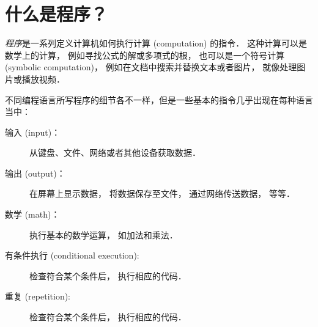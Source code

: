 \section{什么是程序？}



{\em 程序}是一系列定义计算机如何执行计算 (computation) 的指令． 这种计算可以是数学上的计算， 例如寻找公式的解或多项式的根， 也可以是一个符号计算 (symbolic computation)， 例如在文档中搜索并替换文本或者图片， 就像处理图片或播放视频．
  


不同编程语言所写程序的细节各不一样，但是一些基本的指令几乎出现在每种语言当中：


\begin{description}

\item[输入 (input)：] 从键盘、文件、网络或者其他设备获取数据．

\item[输出 (output)：] 在屏幕上显示数据， 将数据保存至文件， 通过网络传送数据， 等等．

\item[数学 (math)：] 执行基本的数学运算， 如加法和乘法．

\item[有条件执行 (conditional execution):] 检查符合某个条件后， 执行相应的代码．

\item[重复 (repetition):] 检查符合某个条件后， 执行相应的代码．

\end{description}

